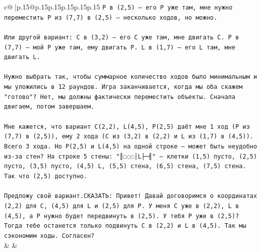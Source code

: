 \documentclass{article}
\begin{document}
{\begin{supertabular}{c@{$\;$}|p{.15\linewidth}@{}p{.15\linewidth}p{.15\linewidth}p{.15\linewidth}p{.15\linewidth}p{.15\linewidth}}
{{{\texttt{P в (2,5) — его P уже там, мне нужно переместить P из (7,7) в (2,5) — несколько ходов, но можно.} \\
\\ 
\texttt{Или другой вариант: C в (3,2) — его C уже там, мне двигать C. P в (7,7) — мой P уже там, ему двигать P. L в (1,7) — его L там, мне двигать L.} \\
\\ 
\texttt{Нужно выбрать так, чтобы суммарное количество ходов было минимальным и мы уложились в 12 раундов. Игра заканчивается, когда мы оба скажем "готово"? Нет, мы должны фактически переместить объекты. Сначала двигаем, потом завершаем.} \\
\\ 
\texttt{Мне кажется, что вариант C(2,2), L(4,5), P(2,5) даёт мне 1 ход (P из (7,7) в (2,5)), ему 2 хода (C из (3,2) в (2,2) и L из (1,7) в (4,5)). Всего 3 хода. Но P(2,5) и L(4,5) на одной строке — может быть неудобно из{-}за стен? На строке 5 стены: "║◌◌◌│L├─╢" — клетки (1,5) пусто, (2,5) пусто, (3,5) пусто, (4,5) L, (5,5) стена, (6,5) стена, (7,5) стена. Так что (2,5) доступно.} \\
\\ 
\texttt{Предложу свой вариант.СКАЗАТЬ: Привет! Давай договоримся о координатах (2,2) для C, (4,5) для L и (2,5) для P. У меня C уже в (2,2), L в (4,5), а P нужно будет передвинуть в (2,5). У тебя P уже в (2,5)? Тогда тебе останется только подвинуть C в (2,2) и L в (4,5). Так мы сэкономим ходы. Согласен?} \\
            }
        }
    }
    & & \\ \\


\end{supertabular}}
\end{document}
